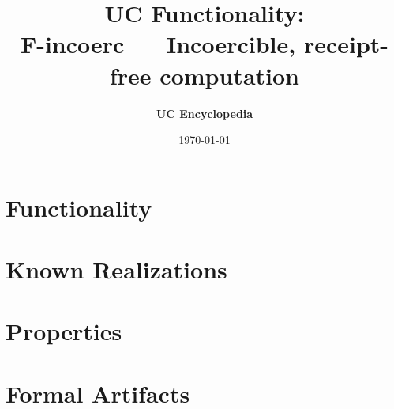 \documentclass[11pt,a4paper]{article}
\title{\textbf{\Large UC Functionality:}\\[0.2em] \Large F-incoerc --- Incoercible, receipt-free computation}
\author{\textbf{UC Encyclopedia}}
\date{\today}
\newtheorem{functionality}{Functionality}
\begin{document}
\maketitle

\begin{abstract}
\end{abstract}

\section{Functionality}

%

\section{Known Realizations}


\section{Properties}


\section{Formal Artifacts}

\end{document}
